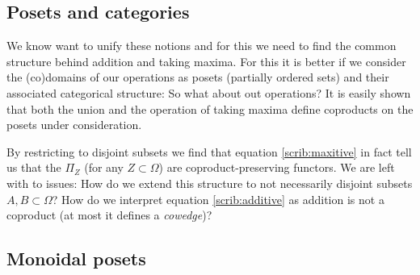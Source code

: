 \subsection{Posets and categories}

    We know want to unify these notions and for this we need to find the common structure behind addition and taking maxima. For this it is better if we consider the (co)domains of our operations as posets (partially ordered sets) and their associated categorical structure:
    So what about out operations? It is easily shown that both the union and the operation of taking maxima define coproducts on the posets under consideration.

    By restricting to disjoint subsets we find that equation \ref{scrib:maxitive} in fact tell us that the $\Pi_Z$ (for any $Z\subset\Omega$) are coproduct-preserving functors. We are left with to issues: How do we extend this structure to not necessarily disjoint subsets $A,B\subset\Omega$? How do we interpret equation \ref{scrib:additive} as addition is not a coproduct (at most it defines a \textit{cowedge})?

\subsection{Monoidal posets}

